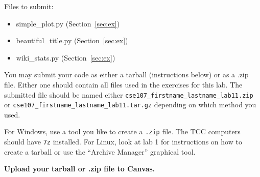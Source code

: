 \documentclass[11pt]{cselabheader}
\begin{document}
Files to submit:
\begin{itemize}
\item simple\_plot.py (Section~\ref{sec:ex})
\item beautiful\_title.py (Section~\ref{sec:ex})
\item wiki\_stats.py (Section~\ref{sec:ex})
\end{itemize}

You may submit your code as either a tarball (instructions below) or as a .zip
file. Either one should contain all files used in the exercises for this lab.
The submitted file should be named either
\texttt{cse107\_firstname\_lastname\_lab11.zip} or
\texttt{cse107\_firstname\_lastname\_lab11.tar.gz} depending on which method you
used.

For Windows, use a tool you like to create a \texttt{.zip} file. The TCC
computers should have \texttt{7z} installed. For Linux, look at lab 1 for
instructions on how to create a tarball or use the ``Archive Manager'' graphical
tool.

\begin{center}
  \textbf{Upload your tarball or .zip file to Canvas.}
\end{center}
\end{document}
